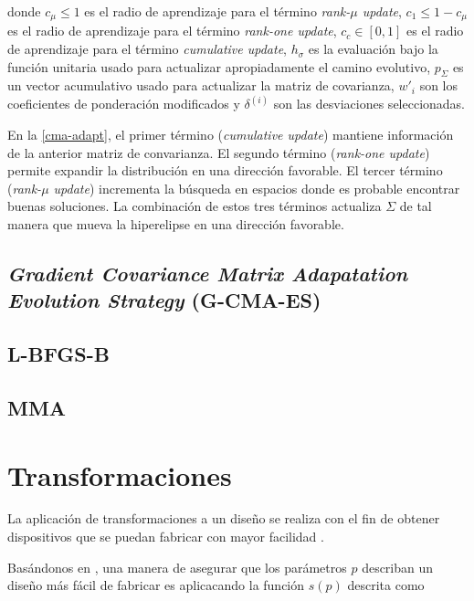 donde $c_{\mu} \leq 1$ es el radio de aprendizaje para el término \emph{rank-$\mu$ update}, 
$c_1 \leq 1 - c_{\mu}$ es el radio de aprendizaje para el término \emph{rank-one update}, 
$c_c \in [0, 1]$ es el radio de aprendizaje para el término \emph{cumulative update}, 
$h_{\sigma}$ es la evaluación bajo la función unitaria usado para actualizar
apropiadamente el camino evolutivo, 
$p_{\Sigma}$ es un vector acumulativo usado para actualizar la matriz de
covarianza, 
$w'_i$ son los coeficientes de ponderación modificados y
$\delta^{(i)}$ son las desviaciones seleccionadas.

En la \autoref{cma-adapt}, el primer término (\emph{cumulative update}) 
mantiene información de la anterior matriz de convarianza.
El segundo término (\emph{rank-one update}) permite expandir la distribución en
una dirección favorable.
El tercer término (\emph{rank-$\mu$ update}) incrementa la búsqueda en espacios
donde es probable encontrar buenas soluciones.
La combinación de estos tres términos actualiza $\Sigma$ de tal manera que
mueva la hiperelipse en una dirección favorable.

\subsection{\emph{Gradient Covariance Matrix Adapatation Evolution Strategy} (G-CMA-ES)}


\subsection{L-BFGS-B}


\subsection{MMA}


\section{Transformaciones}\label{sec:transformations}

La aplicación de transformaciones a un diseño se realiza con el fin de obtener
dispositivos que se puedan fabricar con mayor facilidad \citep{Su2020}. 

Basándonos en \cite{Zhang2021}, una manera de asegurar que los
parámetros $p$ describan un diseño más fácil de fabricar es aplicacando la función $s(p)$
descrita como

